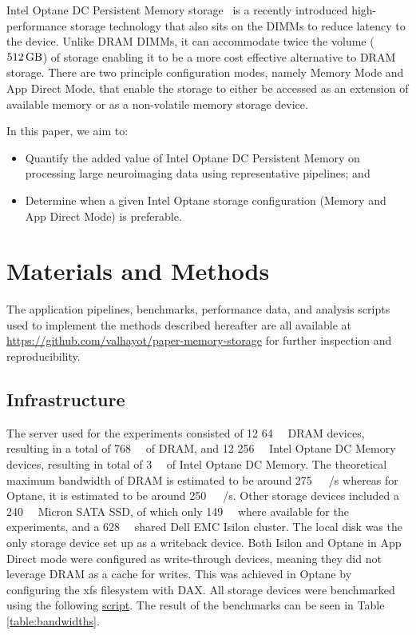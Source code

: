 \documentclass[conference]{IEEEtran}
\begin{document}
Intel Optane DC Persistent Memory storage~\cite{optanebrief} is a recently introduced high-performance
storage technology that also sits on the DIMMs to reduce latency to the device.
Unlike DRAM DIMMs, it can accommodate twice the volume ($\SI{512}{\giga\byte}$) of
storage enabling it to be a more cost effective alternative to DRAM storage.
There are two principle configuration modes, namely Memory Mode and App Direct Mode,
that enable the storage to either be accessed as an extension of available memory 
or as a non-volatile memory storage device.


In this paper, we aim to:
\begin{itemize}
        \item Quantify the added value of Intel Optane DC Persistent Memory on 
            processing large neuroimaging data using representative pipelines; and
        \item Determine when a given Intel Optane storage configuration (Memory 
            and App Direct Mode) is preferable.
\end{itemize}

\section{Materials and Methods}
The application pipelines, benchmarks, performance data, and analysis scripts used 
to implement the methods described hereafter are all available at 
\url{https://github.com/valhayot/paper-memory-storage} for 
further inspection and reproducibility.

\subsection{Infrastructure}

The server used for the experiments consisted of 12 \SI{64}{\gibi\byte} DRAM devices,
resulting in a total of \SI{768}{\gibi\byte} of DRAM, and 12 \SI{256}{\giga\byte} Intel Optane DC Memory
devices, resulting in total of \SI{3}{\tebi\byte} of Intel Optane DC Memory. The theoretical maximum bandwidth
of DRAM is estimated to be around \SI{275}{\gibi\byte}~/s whereas for Optane, it is
estimated to be around \SI{250}{\gibi\byte}~/s.
Other storage devices included a \SI{240}{\gibi\byte} Micron SATA SSD, of which
only \SI{149}{\gibi\byte} where available for the experiments, and a \SI{628}{\tebi\byte} shared Dell EMC Isilon cluster. The local disk
was the only storage device set up as a writeback device. Both Isilon and Optane in
App Direct mode were configured as write-through devices, meaning they did not leverage
DRAM as a cache for writes. This was achieved in Optane by configuring the xfs filesystem with
DAX. All storage devices were benchmarked using the following \href{https://github.com/ValHayot/paper-memory-storage/scripts/bench_disks.sh}{script}.
The result of the benchmarks can be seen in Table \ref{table:bandwidths}.
\end{document}
